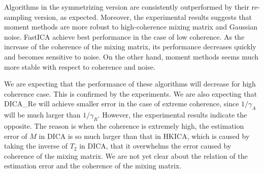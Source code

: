 \documentclass[twoside]{article}
\theoremstyle{definition}
\begin{document}
Algorithms in the symmetrizing version are consistently outperformed by their re-sampling version, as expected. 
Moreover, the experimental results suggests that moment methods are more robust to high-coherence mixing matrix and Gaussian noise.
FastICA achieve best performance in the case of low coherence.
As the increase of the coherence of the mixing matrix, its performance decreases quickly and becomes sensitive to noise.
On the other hand, moment methods seems much more stable with respect to coherence and noise.

We are expecting that the performance of these algorithms will decrease for high coherence case. 
This is confirmed by the experiments. 
We are also expecting that DICA\_Re will achieve smaller error in the case of extreme coherence, since $1/\gamma_A$ will be much larger than $1/\gamma_R$. 
However, the experimental results indicate the opposite. 
The reason is when the coherence is extremely high, the estimation error of $M$ in DICA is so much larger than that in HKICA, which is caused by taking the inverse of $T_2$ in DICA, that it overwhelms the error caused by coherence of the mixing matrix.
We are not yet clear about the relation of the estimation error and the coherence of the mixing matrix.
\end{document}
